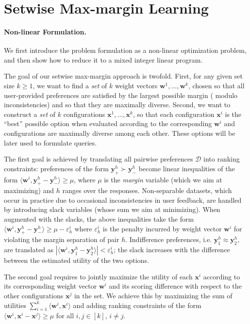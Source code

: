 \documentclass{article}
\renewcommand\[{\begin{equation}}
\renewcommand\]{\end{equation}}
\newcommand{\calvar}[1]{\ensuremath{\mathcal{#1}}}
\newcommand{\calD}{\calvar{D}}
\newcommand{\vecvar}[1]{\ensuremath{\boldsymbol{#1}}}
\newcommand{\vw}{\vecvar{w}}
\newcommand{\vx}{\vecvar{x}}
\newcommand{\vy}{\vecvar{y}}
\begin{document}
\section{Setwise Max-margin Learning}
\label{sec:formulation}
\paragraph{Non-linear Formulation.} We first introduce the problem
formulation as a %
non-linear optimization problem, and
then show how to reduce it to a mixed integer linear program.%

The goal of our setwise max-margin approach is twofold. First, for any
given set size $k\geq 1$, we want to find a {\em set} of $k$ weight
vectors $\vw^{1}, \ldots, \vw^{k}$, chosen so that all user-provided
preferences are satisfied by the largest possible margin (%
modulo inconsistencies) and so that they are maximally
diverse.  Second, we want to construct a {\em set} of $k$
configurations $\vx^{1}, \ldots, \vx^{k}$, so that each configuration
$\vx^{i}$ is the ``best'' possible option when evaluated according to
the corresponding $\vw^{i}$ and configurations are maximally diverse
among each other. These options will be later used to formulate
queries.

The first goal is achieved by translating all pairwise preferences
$\calD$ into ranking constraints: preferences of the form
$\vy^h_+ \succ \vy^h_-$ become linear inequalities of the form
$\langle \vw^i, \vy^h_+ - \vy^h_- \rangle \geq \mu$, where $\mu$ is the
{\em margin} variable (which we aim at maximizing) and $h$ ranges over
the responses.  Non-separable datasets, which occur in practice due to
occasional inconsistencies in user feedback, are handled by
introducing slack variables (whose sum we aim at minimizing). When
augmented with the slacks, the above inequalities take the form
$\langle \vw^{i}, \vy^{h}_+ - \vy^{h}_- \rangle \ge \mu - \varepsilon^{i}_h$
where $\varepsilon^{i}_h$ is the penalty incurred by weight vector $\vw^{i}$
for violating the margin separation of pair $h$. Indifference preferences, i.e.
$\vy^h_1 \approx \vy^h_2$, are translated as $|\langle \vw^i, \vy^h_1 - \vy^h_2 \rangle| < \varepsilon^i_h$;
the slack increases with the difference between the estimated utility of the
two options.

The second goal requires to jointly maximize the utility of each
$\vx^{i}$ according to its corresponding weight vector $\vw^i$ and its
scoring difference with respect to the other configurations $\vx^j$ in
the set. We achieve this by maximizing the sum of utilities
$\sum_{i=1}^k \langle \vw^{i}, \vx^{i} \rangle$ and adding ranking
constraints of the form
$\langle \vw^{i}, \vx^{i} - \vx^{j} \rangle \geq \mu$ for all
$i,j\in[k]$, $i \ne j$.
\end{document}
